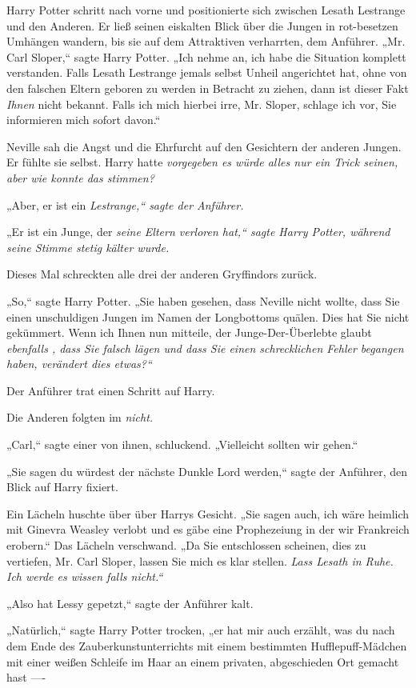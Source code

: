 {Harry Potter schritt nach vorne und positionierte sich zwischen Lesath Lestrange und den Anderen. Er ließ seinen eiskalten Blick über die Jungen in rot-besetzen Umhängen wandern, bis sie auf dem Attraktiven verharrten, dem Anführer. „Mr. Carl Sloper,“ sagte Harry Potter. „Ich nehme an, ich habe die Situation komplett verstanden. Falls Lesath Lestrange jemals selbst Unheil angerichtet hat, ohne von den falschen Eltern geboren zu werden in Betracht zu ziehen, dann ist dieser Fakt \emph{Ihnen} nicht bekannt. Falls ich mich hierbei irre, Mr. Sloper, schlage ich vor, Sie informieren mich sofort davon.“

Neville sah die Angst und die Ehrfurcht auf den Gesichtern der anderen Jungen. Er fühlte sie selbst. Harry hatte \emph{vorgegeben es würde alles nur ein Trick seinen, aber wie konnte das stimmen?}

„Aber, er ist ein \emph{Lestrange,“ sagte der Anführer.}

„Er ist ein Junge, der \emph{seine Eltern verloren hat,“ sagte Harry Potter, während seine Stimme stetig kälter wurde.}

Dieses Mal schreckten alle drei der anderen Gryffindors zurück.

„So,“ sagte Harry Potter. „Sie haben gesehen, dass Neville nicht wollte, dass Sie einen unschuldigen Jungen im Namen der Longbottoms quälen. Dies hat Sie nicht gekümmert. Wenn ich Ihnen nun mitteile, der Junge-Der-Überlebte glaubt \emph{ebenfalls , dass Sie falsch lägen und dass Sie einen schrecklichen Fehler begangen haben, verändert dies etwas?“}

Der Anführer trat einen Schritt auf Harry.

Die Anderen folgten im \emph{nicht.}

„Carl,“ sagte einer von ihnen, schluckend. „Vielleicht sollten wir gehen.“

„Sie sagen du würdest der nächste Dunkle Lord werden,“ sagte der Anführer, den Blick auf Harry fixiert.

Ein Lächeln huschte über über Harrys Gesicht. „Sie sagen auch, ich wäre heimlich mit Ginevra Weasley verlobt und es gäbe eine Prophezeiung in der wir Frankreich erobern.“ Das Lächeln verschwand. „Da Sie entschlossen scheinen, dies zu vertiefen, Mr. Carl Sloper, lassen Sie mich es klar stellen. \emph{Lass Lesath in Ruhe. Ich werde es wissen falls nicht.“}

„Also hat Lessy gepetzt,“ sagte der Anführer kalt.

„Natürlich,“ sagte Harry Potter trocken, „er hat mir auch erzählt, was du nach dem Ende des Zauberkunstunterrichts mit einem bestimmten Hufflepuff-Mädchen mit einer weißen Schleife im Haar an einem privaten, abgeschieden Ort gemacht hast ----

}
